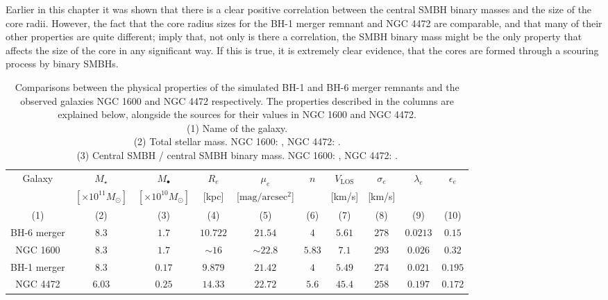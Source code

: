 \documentclass[english, oneside]{HYgradu}
\begin{document}
Earlier in this chapter it was shown that there is a clear positive correlation between the central SMBH binary masses and the size of the core radii. However, the fact that the core radius sizes for the BH-1 merger remnant and NGC 4472 are comparable, and that many of their other properties are quite different; imply that, not only is there a correlation, the SMBH binary mass might be the only property that affects the size of the core in any significant way. If this is true, it is extremely clear evidence, that the cores are formed through a scouring process by binary SMBHs.


\begin{table}
	\begin{center}
		\scriptsize
		\begin{tabular}{c c c c c c c c c c}
		\hline
		\hline
		Galaxy & $M_\star$ & $M_\bullet$ & $R_e$ & $\mu_e$ & $n$ & 
		$V_\mathrm{LOS}$ & $\sigma_e$ & $\lambda_e$ &
		$\epsilon_e$ \\
		& $[\times 10^{11} M_\odot]$ & $[\times 10^{10} M_\odot]$ &
		[kpc] & [$\mathrm{mag/arcsec^2}$] & & [km/s] & [km/s] & & \\
		(1) & (2) & (3) & (4) & (5) & (6) & (7) & (8) & (9) & (10) \\
		\hline
		BH-6 merger & $8.3$ & $1.7$ & $10.722$ & $21.54$ & $4$ & $5.61$ & $278$ & $0.0213$ & $0.15$ \\
		NGC 1600 & $8.3$ & $1.7$ & $\sim 16$ & $\sim 22.8$ & $5.83$ & $7.1$ & $293$ & $0.026$ & $0.32$ \\
		\hdashline
		BH-1 merger & $8.3$ & $0.17$ & $9.879$ & $21.42$ & $4$ & $5.49$ & $274$ & $0.021$ & $0.195$ \\
		NGC 4472 & $6.03$ & $0.25$ & $14.33$ & $22.72$ & $5.6$ & $45.4$ & 
		$258$ & $0.197$ & $0.172$ \\
		\hline
		\end{tabular}
	\end{center}
	\caption{Comparisons between the physical properties of the simulated BH-1 and BH-6 merger remnants and the observed galaxies NGC 1600 and NGC 4472 respectively. The properties described in the columns are explained below, alongside the sources for their values in NGC 1600 and NGC 4472. \\
	(1) Name of the galaxy. \\
	(2) Total stellar mass. NGC 1600: \cite{Thomas2016}, NGC 4472: \cite{Veale2018lambda}. \\
	(3) Central SMBH / central SMBH binary mass. NGC 1600:  \cite{Thomas2016}, NGC 4472: \cite{Rusli2013_BHmass}. \\
}
\end{table}
\end{document}
